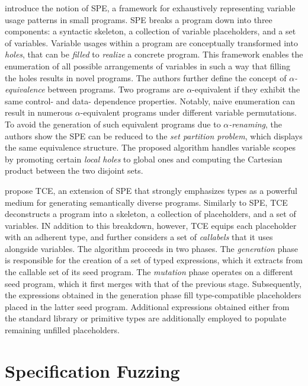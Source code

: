 \citet{zhang2017skeletal} introduce the notion of \gls{SPE}, a framework
for exhaustively representing variable usage patterns in small programs.
\gls{SPE} breaks a program down into three components: a syntactic skeleton,
a collection of variable placeholders, and a set of variables.
Variable usages within a program are conceptually transformed into \textit{holes},
that can be \textit{filled} to \textit{realize} a concrete program.
This framework enables the enumeration of all possible arrangements
of variables in such a way that filling the holes results in novel programs.
The authors further define the concept of $\alpha$\textit{-equivalence} between
programs.
Two programs are $\alpha$-equivalent if they exhibit the same control- and data-
dependence properties.
Notably, naive enumeration can result in numerous $\alpha$-equivalent programs
under different variable permutations.
To avoid the generation of such equivalent programs due to $\alpha$\textit{-renaming},
the authors show the \gls{SPE} can be reduced to the \textit{set partition problem},
which displays the same equivalence structure.
The proposed algorithm handles variable scopes by promoting certain
\textit{local holes} to global ones and computing the Cartesian product 
between the two disjoint sets.


\citet{stepanov2021type} propose \Gls{TCE}, an extension of \gls{SPE} 
that strongly emphasizes types as a powerful medium for generating
semantically diverse programs.
Similarly to \gls{SPE}, \gls{TCE} deconstructs a program into a 
skeleton, a collection of placeholders, and a set of variables.
IN addition to this breakdown, however, \gls{TCE} equips each 
placeholder with an adherent type, and further considers a set
of \textit{callabels} that it uses alongside variables.
The algorithm proceeds in two phases.
The \textit{generation} phase is responsible for the 
creation of a set of typed expressions, which it extracts from
the callable set of its seed program.
The \textit{mutation} phase operates on a different seed program,
which it first merges with that of the previous stage.
Subsequently, the expressions obtained in the generation phase
fill type-compatible placeholders placed in the latter seed program.
Additional expressions obtained either from the standard library 
or primitive types are additionally employed to populate
remaining unfilled placeholders.




\section{\label{sec:specification_fuzzing}Specification Fuzzing}


